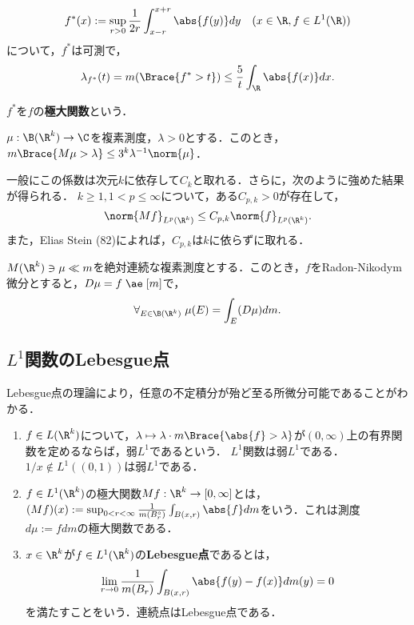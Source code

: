 \documentclass[uplatex, dvipdfmx]{jsreport}
\begin{document}
\begin{corollary}[極大不等式]
    \[f^*(x):=\sup_{r>0}\frac{1}{2r}\int^{x+r}_{x-r}\abs{f(y)}dy\quad(x\in\R,f\in L^1(\R))\]
    について，$f^*$は可測で，
    \[\lambda_{f^*}(t)=m(\Brace{f^*>t})\le\frac{5}{t}\int_\R\abs{f(x)}dx.\]
\end{corollary}
\begin{remarks}
    $f^*$を$f$の\textbf{極大関数}という．
\end{remarks}

\begin{theorem}[極大不等式]
    $\mu:\B(\R^k)\to\C$を複素測度，$\lambda>0$とする．このとき，$m\Brace{M\mu>\lambda}\le3^k\lambda^{-1}\norm{\mu}$．
\end{theorem}
\begin{remarks}
    一般にこの係数は次元$k$に依存して$C_k$と取れる．さらに，次のように強めた結果が得られる．
    $k\ge1,1<p\le\infty$について，ある$C_{p,k}>0$が存在して，
    \[\norm{Mf}_{L^p(\R^k)}\le C_{p,k}\norm{f}_{L^p(\R^k)}.\]
    また，Elias Stein (82)によれば，$C_{p,k}$は$k$に依らずに取れる．
\end{remarks}

\begin{theorem}[対称微分の性質]
    $M(\R^k)\ni \mu\ll m$を絶対連続な複素測度とする．このとき，$f$をRadon-Nikodym微分とすると，$D\mu=f\;\ae\;[m]$で，
    \[\forall_{E\in\B(\R^k)}\;\mu(E)=\int_E(D\mu)dm.\]
\end{theorem}

\subsection{$L^1$関数のLebesgue点}

\begin{tcolorbox}[colframe=ForestGreen, colback=ForestGreen!10!white,breakable,colbacktitle=ForestGreen!40!white,coltitle=black,fonttitle=\bfseries\sffamily,
title=]
    Lebesgue点の理論により，任意の不定積分が殆ど至る所微分可能であることがわかる．
\end{tcolorbox}

\begin{definition}\mbox{}
    \begin{enumerate}
        \item $f\in L(\R^k)$について，$\lambda\mapsto\lambda\cdot m\Brace{\abs{f}>\lambda}$が$(0,\infty)$上の有界関数を定めるならば，弱$L^1$であるという．
        $L^1$関数は弱$L^1$である．$1/x\notin L^1((0,1))$は弱$L^1$である．
        \item $f\in L^1(\R^k)$の極大関数$Mf:\R^k\to[0,\infty]$とは，$(Mf)(x):=\sup_{0<r<\infty}\frac{1}{m(B_r^\circ)}\int_{B(x,r)}\abs{f}dm$をいう．これは測度$d\mu:=fdm$の極大関数である．
        \item $x\in\R^k$が$f\in L^1(\R^k)$の\textbf{Lebesgue点}であるとは，
        \[\lim_{r\to0}\frac{1}{m(B_r)}\int_{B(x,r)}\abs{f(y)-f(x)}dm(y)=0\]
        を満たすことをいう．連続点はLebesgue点である．
    \end{enumerate}
\end{definition}
\end{document}

